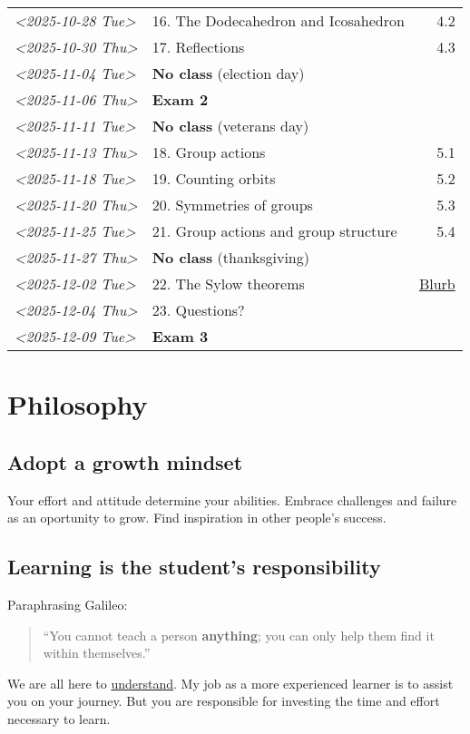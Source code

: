 \documentclass[11pt]{article}
\begin{document}
\begin{center}
\begin{tabular}{l|l|r}
\textit{<2025-10-28 Tue>} & 16. The Dodecahedron and Icosahedron & 4.2\\[0pt]
\textit{<2025-10-30 Thu>} & 17. Reflections & 4.3\\[0pt]
\textit{<2025-11-04 Tue>} & \textbf{No class} (election day) & \\[0pt]
\textit{<2025-11-06 Thu>} & \textbf{Exam 2} & \\[0pt]
\textit{<2025-11-11 Tue>} & \textbf{No class} (veterans day) & \\[0pt]
\textit{<2025-11-13 Thu>} & 18. Group actions & 5.1\\[0pt]
\textit{<2025-11-18 Tue>} & 19. Counting orbits & 5.2\\[0pt]
\textit{<2025-11-20 Thu>} & 20. Symmetries of groups & 5.3\\[0pt]
\textit{<2025-11-25 Tue>} & 21. Group actions and group structure & 5.4\\[0pt]
\textit{<2025-11-27 Thu>} & \textbf{No class} (thanksgiving) & \\[0pt]
\textit{<2025-12-02 Tue>} & 22. The Sylow theorems & \href{https://kconrad.math.uconn.edu/blurbs/grouptheory/sylowpf.pdf}{Blurb}\\[0pt]
\textit{<2025-12-04 Thu>} & 23. Questions? & \\[0pt]
\textit{<2025-12-09 Tue>} & \textbf{Exam 3} & \\[0pt]
\hline
\end{tabular}
\end{center}

\section*{Philosophy}
\label{sec:org9b414cc}
\subsection*{Adopt a growth mindset}
\label{sec:orgfae3e73}
Your effort and attitude determine your abilities. Embrace challenges and
failure as an oportunity to grow. Find inspiration in other people's success.
\subsection*{Learning is the student's responsibility}
\label{sec:org070c167}
Paraphrasing Galileo:
\begin{quote}
``You cannot teach a person \textbf{anything}; you can only help
them find it within themselves.''
\end{quote}
We are all here to \uline{understand}. My job as a more experienced learner is to
assist you on your journey. But you are responsible for investing the time and
effort necessary to learn.
\end{document}
